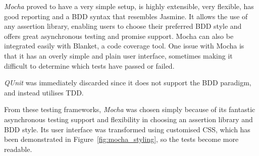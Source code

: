 {{		\emph{Mocha} proved to have a very simple setup, is highly extensible, very flexible, has good reporting and a BDD syntax that resembles Jasmine. It allows the use of any assertion library, enabling users to choose their preferred BDD style and offers great asynchronous testing and promise support. Mocha can also be integrated easily with Blanket, a code coverage tool. One issue with Mocha is that it has an overly simple and plain user interface, sometimes making it difficult to determine which tests have passed or failed.

		\emph{QUnit} was immediately discarded since it does not support the BDD paradigm, and instead utilises TDD.

		From these testing frameworks, \emph{Mocha} was chosen simply because of its fantastic asynchronous testing support and flexibility in choosing an assertion library and BDD style. Its user interface was transformed using customised CSS, which has been demonstrated in Figure~\ref{fig:mocha_styling}, so the tests become more readable.

		

	}

}

